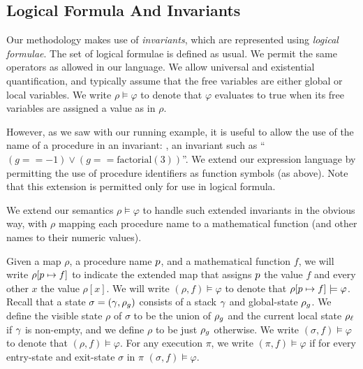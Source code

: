 \subsection*{Logical Formula And Invariants}

Our methodology makes use of \emph{invariants}, which are represented using \emph{logical formulae}.
The set of logical formulae is defined as usual. We permit the same operators as allowed in our language.
We allow universal and existential quantification, and typically assume that the free variables are either
global or local variables.
We write $\rho \models \varphi$
to denote that $\varphi$ evaluates to true when its free variables are assigned a value as in $\rho$.

However, as we saw with our running example, it is useful to allow the use of the name of a procedure in
an invariant: \eg, an invariant such as ``$(g == -1) \vee (g == \text{factorial}(3))$''.
We extend our expression language by permitting the use of procedure identifiers as
function symbols (as above). Note that this extension is permitted only for use in logical formula.

We extend our semantics $\rho \models \varphi$ to handle such extended invariants in the obvious way,
with $\rho$ mapping each procedure name to a mathematical function (and other names to their numeric values).

Given a map $\rho$, a procedure name $p$, and a mathematical function $f$, we will write
$\rho[p \mapsto f]$ to indicate the extended map that assigns $p$ the value $f$ and every
other $x$ the value $\rho[x]$.
We will write $(\rho,f) \models \varphi$ to denote that $\rho[p \mapsto f] \models \varphi$.
Recall that a state $\sigma =(\gamma,\rho_g)$ consists of a stack $\gamma$ and global-state $\rho_g$.
We define the visible state $\rho$ of $\sigma$ to be the union of $\rho_g$ and the current local state $\rho_\ell$
if $\gamma$ is non-empty, and we define $\rho$ to be just $\rho_g$ otherwise.
We write $(\sigma,f) \models \varphi$ to denote that $(\rho,f) \models \varphi$.
For any execution $\pi$, we write $(\pi,f) \models \varphi$ if for every entry-state and exit-state
$\sigma$ in $\pi$ $(\sigma,f) \models \varphi$.


